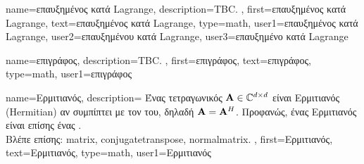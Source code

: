 {name={\foreignlanguage{greek}{επαυξημένος κατά} Lagrange},
	description={TBC. },
	first={\foreignlanguage{greek}{επαυξημένος κατά} Lagrange},
	text={\foreignlanguage{greek}{επαυξημένος κατά} Lagrange},
	type=math,
	user1={\foreignlanguage{greek}{επαυξημένος κατά} Lagrange}, %
	user2={\foreignlanguage{greek}{επαυξημένου κατά} Lagrange}, %
	user3={\foreignlanguage{greek}{επαυξημένο κατά} Lagrange} %
}%

{name={\foreignlanguage{greek}{επιγράφος}},
  description={TBC. },
	first={\foreignlanguage{greek}{επιγράφος}},
	text={\foreignlanguage{greek}{επιγράφος}},
	type=math,
	user1={\foreignlanguage{greek}{επιγράφος}} %
}%

 {name={\foreignlanguage{greek}{Ερμιτιανός}},
 	description={ \foreignlanguage{greek}{Ένας τετραγωνικός}  
		${\bf A} \in \mathbb{C}^{d \times d}$ \foreignlanguage{greek}{είναι Ερμιτιανός} (Hermitian) \foreignlanguage{greek}{αν 
		συμπίπτει με τον}  \foreignlanguage{greek}{του, δηλαδή ${\bf A}={\bf A}^{H}$.
                 Προφανώς, ένας Ερμιτιανός}   \foreignlanguage{greek}{είναι επίσης ένας} .
                 \\
                \foreignlanguage{greek}{Βλέπε επίσης:} \gls{matrix}, \gls{conjugatetranspose}, \gls{normalmatrix}. },
 	first={\foreignlanguage{greek}{Ερμιτιανός}},
 	text={\foreignlanguage{greek}{Ερμιτιανός}},
	type=math,
	user1={\foreignlanguage{greek}{Ερμιτιανός}} %
}

